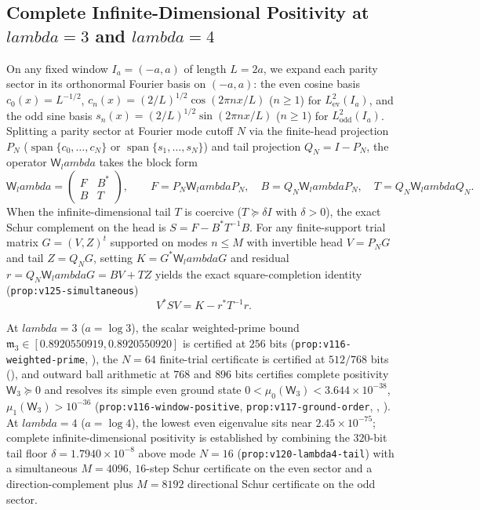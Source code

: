 \documentclass[11pt]{article}
\def\lambda{lambda}%
\theoremstyle{remark}
\begin{document}
\subsection{Complete Infinite-Dimensional Positivity at \texorpdfstring{$\lambda = 3$ and $\lambda = 4$}{lambda = 3 and lambda = 4}}
On any fixed window $I_a = (-a,a)$ of length $L = 2a$, we expand each parity sector in its orthonormal Fourier basis on $(-a,a)$: the even cosine basis $c_0(x) = L^{-1/2}$, $c_n(x) = (2/L)^{1/2}\cos(2\pi n x/L)$ ($n \ge 1$) for $L^2_{\mathrm{ev}}(I_a)$, and the odd sine basis $s_n(x) = (2/L)^{1/2}\sin(2\pi n x/L)$ ($n \ge 1$) for $L^2_{\mathrm{odd}}(I_a)$. Splitting a parity sector at Fourier mode cutoff $N$ via the finite-head projection $P_N$ ($\operatorname{span}\{c_0,\dots,c_N\}$ or $\operatorname{span}\{s_1,\dots,s_N\}$) and tail projection $Q_N = I - P_N$, the operator $\mathsf{W}_\lambda$ takes the block form
\begin{equation}\label{eq:head-tail-block}
  \mathsf{W}_\lambda = \begin{pmatrix} F & B^* \\ B & T \end{pmatrix}, \qquad F = P_N\mathsf{W}_\lambda P_N, \quad B = Q_N\mathsf{W}_\lambda P_N, \quad T = Q_N\mathsf{W}_\lambda Q_N.
\end{equation}
When the infinite-dimensional tail $T$ is coercive ($T \succeq \delta I$ with $\delta > 0$), the exact Schur complement on the head is $S = F - B^* T^{-1} B$. For any finite-support trial matrix $G = (V, Z)^t$ supported on modes $n \le M$ with invertible head $V = P_N G$ and tail $Z = Q_N G$, setting $K = G^*\mathsf{W}_\lambda G$ and residual $r = Q_N\mathsf{W}_\lambda G = BV + TZ$ yields the exact square-completion identity (\texttt{prop:v125-simultaneous})
\begin{equation}\label{eq:simultaneous-schur-id}
  V^* S V = K - r^* T^{-1} r.
\end{equation}

At $\lambda = 3$ ($a = \log 3$), the scalar weighted-prime bound $\mathfrak{m}_3 \in [0.8920550919, 0.8920550920]$ is certified at $256$ bits (\texttt{prop:v116-weighted-prime}, ), the $N = 64$ finite-trial certificate is certified at $512/768$ bits (), and outward ball arithmetic at $768$ and $896$ bits certifies complete positivity $\mathsf{W}_3 \succeq 0$ and resolves its simple even ground state $0 < \mu_0(\mathsf{W}_3) < 3.644 \times 10^{-38}$, $\mu_1(\mathsf{W}_3) > 10^{-36}$ (\texttt{prop:v116-window-positive}, \texttt{prop:v117-ground-order}, , ). At $\lambda = 4$ ($a = \log 4$), the lowest even eigenvalue sits near $2.45 \times 10^{-75}$; complete infinite-dimensional positivity is established by combining the $320$-bit tail floor $\delta = 1.7940 \times 10^{-8}$ above mode $N = 16$ (\texttt{prop:v120-lambda4-tail}) with a simultaneous $M = 4096$, $16$-step Schur certificate on the even sector and a direction-complement plus $M = 8192$ directional Schur certificate on the odd sector.
\end{document}
